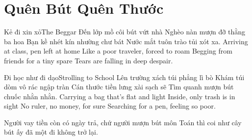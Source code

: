 \chapter{Quên Bút Quên Thước}

\begin{tutuyetbox}{Kẻ đi xin xỏ}{The Beggar}
Đến lớp mồ côi bút vứt nhà
Nghèo nàn mượn đỡ thằng ba hoa
Bạn kề nhét kín nhường chư bát
Nước mắt tuôn trào tủi xót xa.
\tcblower
Arriving at class, pen left at home 
Like a poor traveler, forced to roam 
Begging from friends for a tiny spare 
Tears are falling in deep despair.
\end{tutuyetbox}

\begin{tutuyetbox}{Đi học như đi dạo}{Strolling to School}
Lên trường xách túi phẳng lì bò
Khám túi dòm vô rác ngập tràn
Cán thước tiền lưng xài sạch sẽ
Tìm quanh mượn bút chuốc nhằn nhằn.
\tcblower
Carrying a bag that's flat and light 
Inside, only trash is in sight 
No ruler, no money, for sure 
Searching for a pen, feeling so poor.
\end{tutuyetbox}

\begin{ghichu}
Người vay tiền còn có ngày trả, chứ người mượn bút môn Toán thì coi như cây bút ấy đã một đi không trở lại.
\end{ghichu}